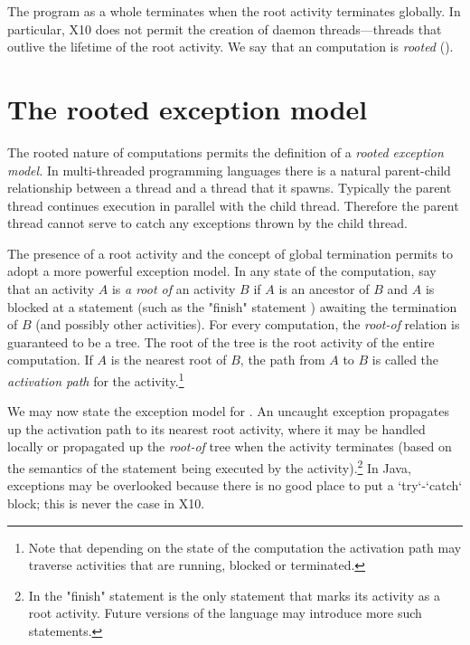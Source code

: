 The program as a whole terminates when the root activity terminates globally.
In particular, X10 does not permit the creation of 
daemon threads---threads that outlive the lifetime of the root
activity.  We say that an \Xten{} computation is {\em rooted}
().


\section{The \Xten{} rooted exception model}
\label{ExceptionModel}

The rooted nature of \Xten{} computations permits the definition of a
{\em rooted exception model.} In multi-threaded programming languages
there is a natural parent-child relationship between a thread and a
thread that it spawns. Typically the parent thread continues execution
in parallel with the child thread. Therefore the parent thread cannot
serve to catch any exceptions thrown by the child thread. 

The presence of a root activity and the concept of global termination permits
\Xten{} to adopt a more powerful exception model. In any state of the
computation, say that an activity $A$ is {\em a root of} an activity $B$ if
$A$ is an ancestor of $B$ and $A$ is blocked at a statement (such as the
\xcd"finish" statement ) awaiting the termination of $B$ (and
possibly other activities). For every \Xten{} computation, the \emph{root-of}
relation is guaranteed to be a tree. The root of the tree is the root activity
of the entire computation. If $A$ is the nearest root of $B$, the path from
$A$ to $B$ is called the {\em activation path} for the activity.\footnote{Note
  that depending on the state of the computation the activation path may
  traverse activities that are running, blocked or terminated.}

We may now state the exception model for \Xten.  An uncaught exception
propagates up the activation path to its nearest root activity, where
it may be handled locally or propagated up the \emph{root-of} tree when
the activity terminates (based on the semantics of the statement being
executed by the activity).\footnote{In \XtenCurrVer{} the \xcd"finish"
statement is the only statement that marks its activity as a root
activity. Future versions of the language may introduce more such
statements.}  In Java, exceptions may be overlooked because there is no good
place to put a \xcd`try`-\xcd`catch` block; this is never the case in X10.

